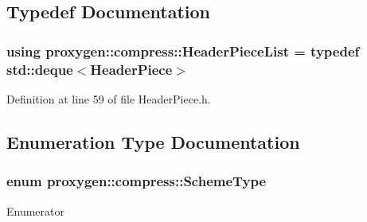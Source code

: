 \subsection{Typedef Documentation}
\subsubsection[{Header\+Piece\+List}]{\setlength{\rightskip}{0pt plus 5cm}using {\bf proxygen\+::compress\+::\+Header\+Piece\+List} = typedef std\+::deque$<${\bf Header\+Piece}$>$}\label{namespaceproxygen_1_1compress_a67fbb975128128544dede33c0c9d273d}


Definition at line 59 of file Header\+Piece.\+h.



\subsection{Enumeration Type Documentation}
\subsubsection[{Scheme\+Type}]{\setlength{\rightskip}{0pt plus 5cm}enum {\bf proxygen\+::compress\+::\+Scheme\+Type}\hspace{0.3cm}{\ttfamily [strong]}}\label{namespaceproxygen_1_1compress_adb2f38c607bc534e811b122dbed14ef2}
\begin{Desc}
\item[Enumerator]\par
\begin{description}
\item[{\em 
Q\+P\+A\+CK\label{namespaceproxygen_1_1compress_adb2f38c607bc534e811b122dbed14ef2a722622dacf22345d7f65d96d10d5d1ae}
}]\item[{\em 
Q\+M\+IN\label{namespaceproxygen_1_1compress_adb2f38c607bc534e811b122dbed14ef2a3b78b53f7b985978b86a572e04bb4f9c}
}]\item[{\em 
H\+P\+A\+CK\label{namespaceproxygen_1_1compress_adb2f38c607bc534e811b122dbed14ef2abeeb357da92a0c9056f9e9f91fc48938}
}]\end{description}
\end{Desc}


